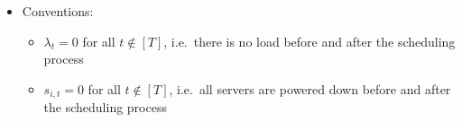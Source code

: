 \documentclass[hidelinks]{article}
\theoremstyle{plain}
\theoremstyle{definition}
\theoremstyle{rem}
\begin{document}
\begin{itemize}
\item Conventions:
\begin{itemize}
	\item $\lambda_{t}=0$ for all $t\notin[T]$, i.e.\ there is no load before and after the scheduling process
	\item $s_{i,t}=0$ for all $t\notin[T]$, i.e.\ all servers are powered down before and after the scheduling process
\end{itemize}
\end{itemize}
\normalsize
\end{document}
